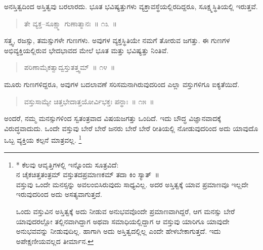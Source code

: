\vspace{-0.35cm}


ಅನಸ್ತಿತ್ವದಿಂದ ಅಸ್ತಿತ್ವವು ಬರಲಾರದು. ಭೂತ ಭವಿಷ್ಯತ್ತುಗಳು ವ್ಯಕ್ತಾವಸ್ಥೆಯಲ್ಲಿರ\-ದಿದ್ದರೂ, ಸೂಕ್ಷ್ಮಸ್ಥಿತಿಯಲ್ಲಿ ಇರುತ್ತವೆ. 

\vspace{-0.3cm}

\begin{verse}
ತೇ ವ್ಯಕ್ತ–ಸೂಕ್ಷ್ಮಾ ಗುಣಾತ್ಮಾನಃ~॥ ೧೩~॥
\end{verse}

\vspace{-0.3cm}


ಸತ್ತ್ವ, ರಜಸ್ಸು, ತಮಸ್ಸುಗಳೇ ಗುಣಗಳು. ಅವುಗಳ ವ್ಯಕ್ತಸ್ಥಿತಿಯೇ ನಮಗೆ ತೋರುವ ಜಗತ್ತು. ಈ ಗುಣಗಳ ಅಭಿವ್ಯಕ್ತಿಯಲ್ಲಿರುವ ಭೇದಭಾವದ ಮೇಲೆ ಭೂತ ಮತ್ತು ಭವಿಷ್ಯತ್ತು ನಿಂತಿವೆ. 

\vspace{-0.3cm}


\begin{verse}
ಪರಿಣಾಮೈಕತ್ವಾದ್ವಸ್ತುತತ್ತ್ವಮ್​~॥ ೧೪~॥
\end{verse}


\vspace{-0.3cm}


ಮೂರು ಗುಣಗಳಿದ್ದರೂ, ಅವುಗಳ ಬದಲಾವಣೆ ಸರಿಸಮನಾಗಿರುವುದರಿಂದ ಎಲ್ಲಾ ವಸ್ತುಗಳಿಗೂ ಐಕ್ಯತೆಯಿದೆ. 


\eject

\begin{verse}
ವಸ್ತುಸಾಮ್ಯೇ ಚಿತ್ತಭೇದಾತ್ತಯೋರ್ವಿಭಕ್ತಃ ಪನ್ಥಾಃ~॥ ೧೫~॥
\end{verse}

\vspace{-0.3cm}


ಅಂದರೆ, ನಮ್ಮ ಮನಸ್ಸುಗಳಿಂದ ಸ್ವತಂತ್ರವಾದ ವಿಷಯಜಗತ್ತು ಒಂದಿದೆ. ಇದು ಬೌದ್ಧ ವಿಜ್ಞಾನವಾದಕ್ಕೆ ವಿರುದ್ಧವಾದುದು. ಒಂದೇ ವಸ್ತುವು ಬೇರೆ ಬೇರೆ ಜನರು ಬೇರೆ ಬೇರೆ ರೀತಿಯಲ್ಲಿ ನೋಡುವುದರಿಂದ ಅದು ಯಾವುದೊ ಒಬ್ಬ ವ್ಯಕ್ತಿಯ ಕಲ್ಪನೆ ಮಾತ್ರವಲ್ಲ. \footnote{* ಕೆಲವು ಆವೃತ್ತಿಗಳಲ್ಲಿ ಇನ್ನೊಂದು ಸೂತ್ರವಿದೆ:\\ನ ಚೈಕಚಿತ್ತತಂತ್ರಮ್​ ವಸ್ತುತದಪ್ರಮಾಣಕಮ್​ ತದಾ ಕಿಂ ಸ್ಯಾತ್​~॥\\ವಸ್ತುವು ಒಂದೇ ಮನಸ್ಸನ್ನು ಅವಲಂಬಿಸಿರುವುದು ಸಾಧ್ಯವಿಲ್ಲ. ಅದರ ಅಸ್ತಿತ್ವಕ್ಕೆ ಯಾವ ಪ್ರಮಾಣವೂ ಇಲ್ಲದೇ ಇರುವುದರಿಂದ ಅದು ಅಸತ್ಯವಾಗುತ್ತದೆ.

ಒಂದು ವಸ್ತುವಿನ ಅಸ್ತಿತ್ವಕ್ಕೆ ಅದು ನೀಡುವ ಅನುಭವವೊಂದೇ ಪ್ರಮಾಣವಾಗಿದ್ದರೆ, ಆಗ ಮನಸ್ಸು ಬೇರೆ ಯಾವುದರಲ್ಲೋ ತಲ್ಲಿನವಾಗಿದ್ದಾಗ ಅಥವಾ ಸಮಾಧಿಯಲ್ಲಿದ್ದಾಗ ಆ ವಸ್ತುವು ಯಾರಿಗೂ ಯಾವುದೇ ಅನುಭವವನ್ನು ನೀಡುವುದಿಲ್ಲ. ಹಾಗಾಗಿ ಅದು ಅಸ್ತಿತ್ವದಲ್ಲಿಲ್ಲ ಎಂದೇ ಹೇಳಬೇಕಾಗುತ್ತದೆ. ಇದು ಅಪೇಕ್ಷಣೀಯವಲ್ಲದ ತೀರ್ಮಾನ.}

